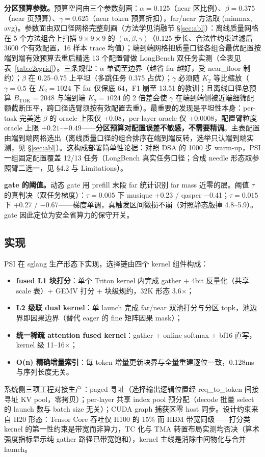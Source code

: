 \documentclass[11pt]{article}
\begin{document}
\textbf{分区预算参数。}预算空间由三个参数刻画：$\alpha{=}0.125$（near 区比例）、$\beta{=}0.375$（near 页预算）、$\gamma{=}0.625$（near token 预算折扣），far/near 方法取 (minmax, avg)。参数面由双口径网格完整刻画（方法学见消融节 \S\ref{sec:abl}）：离线质量网格在 5 个方法组合上扫描 $9\times9\times9$ 的 $(\alpha,\beta,\gamma)$（0.125 步长、合法性约束过滤后 3600 个有效配置，16 样本 trace 均值）；端到端网格把质量口径各组合最优配置按端到端有效预算去重后精选 13 个配置臂做 LongBench 双任务实测（全表见表~\ref{tab:e2egrid}）。三条规律：$\alpha$ 单调至边界（越省 far 越好，受 near\_floor 制约）；$\beta$ 在 0.25--0.75 上平坦（多跳任务 0.375 占优）；$\gamma$ 必须随 $K_2$ 等比缩放（$\gamma{=}0.5$ 在 $K_2{=}1024$ 下 far 仅保底 64，F1 崩至 13.51 的教训；且离线口径总预算 $B_{\mathrm{TOK}}{=}2048$ 与端到端 $K_2{=}1024$ 的 2 倍差会使 $\gamma$ 在端到端侧被近端细筛配额截断压平，跨口径选臂须按有效配置去重）。最重要的发现是平坦性本身：per-task 完美选 $\beta$ 的 oracle 上限仅 +0.08，per-layer oracle 仅 +0.0008，配置臂粒度 oracle 上限 $+0.21$--$+0.49$——\textbf{分区预算对配置误差不敏感，不需要精调}。主表配置由端到端网格选出（离线质量口径的组合排序在端到端反转，选举只认端到端实测，见 \S\ref{sec:abl}）。这构成部署简单性论据：对照 DSA 的 1000 步 warm-up，PSI 一组固定配置覆盖 12/13 任务（LongBench 真实任务口径；合成 needle 形态取参照臂二选一，见 \S4.2 与 Limitations）。

\textbf{gate 的阈值。}动态 gate 用 prefill 末段 far 统计识别 far mass 近零的层。阈值 $\tau$ 的真判决（双任务梯度）：$\tau{=}0.005$ 下 musique +0.23 / qasper $-$0.41；$\tau{=}0.015$ 下 +0.27 / $-$0.67——梯度单调，真触发区间微损不崩（对照静态版掉 4.8--5.9）。gate 因此定位为安全省算力的保守开关。

\subsection{实现}

PSI 在 sglang 生产形态下实现，选择链由四个 kernel 组件构成：
\begin{itemize}
\item \textbf{fused L1 块打分}：单个 Triton kernel 内完成 gather + 4bit 反量化（共享 scale 表）+ GEMV 打分 + 块级规约，32K 形态 3.6$\times$；
\item \textbf{L2 级联 dual kernel}：单 launch 完成 far/near 双池打分与分区 topk，池边界即因果边界（替代 eager 的 fine 矩阵因果 mask）；
\item \textbf{统一稀疏 attention fused kernel}：gather + online softmax + bf16 直写，kernel 级 11--16$\times$；
\item \textbf{O(n) 精确增量索引}：每 token 增量更新块界与全量重建逐位一致，0.128ms 与序列长度无关。
\end{itemize}
系统侧三项工程对接生产：paged 寻址（选择输出逻辑位置经 req\_to\_token 间接寻址 KV pool，零拷贝）；per-layer 共享 index pool 预分配（decode 批量 select 的 launch 数与 batch size 无关）；CUDA graph 捕获区零 host 同步。设计约束来自 H20 形态：Tensor Core 吞吐仅 H100 的 15\% 而 HBM 带宽同级——打分类 kernel 的第一性约束是带宽而非算力，TC 化与 TMA 转置布局实测均否决（算术强度指标显示纯 gather 路径已带宽饱和），kernel 主线是消除中间物化与合并 launch。
\end{document}
